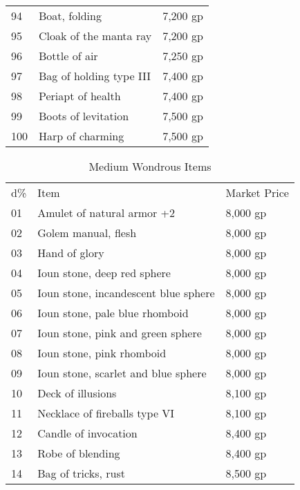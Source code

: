 \begin{table}[]
\begin{tabularx}{\linewidth}{lXl}
94  & Boat, folding                               & 7,200 gp     \\
95  & Cloak of the manta ray                      & 7,200 gp     \\
96  & Bottle of air                               & 7,250 gp     \\
97  & Bag of holding type III                     & 7,400 gp     \\
98  & Periapt of health                           & 7,400 gp     \\
99  & Boots of levitation                         & 7,500 gp     \\
100 & Harp of charming                            & 7,500 gp    
\end{tabularx}
\end{table}

\begin{table}[]
\sffamily
\caption{Medium Wondrous Items}
\setlength{\tabcolsep}{1pt}
\begin{tabularx}{\linewidth}{lXl}
d\% & Item                                        & Market Price \\
01  & Amulet of natural armor +2                  & 8,000 gp     \\
02  & Golem manual, flesh                         & 8,000 gp     \\
03  & Hand of glory                               & 8,000 gp     \\
04  & Ioun stone, deep red sphere                 & 8,000 gp     \\
05  & Ioun stone, incandescent blue sphere        & 8,000 gp     \\
06  & Ioun stone, pale blue rhomboid              & 8,000 gp     \\
07  & Ioun stone, pink and green sphere           & 8,000 gp     \\
08  & Ioun stone, pink rhomboid                   & 8,000 gp     \\
09  & Ioun stone, scarlet and blue sphere         & 8,000 gp     \\
10  & Deck of illusions                           & 8,100 gp     \\
11  & Necklace of fireballs type VI               & 8,100 gp     \\
12  & Candle of invocation                        & 8,400 gp     \\
13  & Robe of blending                            & 8,400 gp     \\
14  & Bag of tricks, rust                         & 8,500 gp     \\

\end{tabularx}
\end{table}
